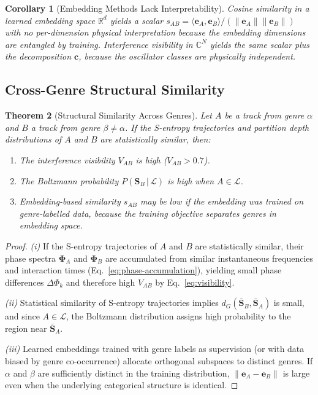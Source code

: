 \documentclass[11pt,twocolumn,a4paper]{article}
\newtheorem{theorem}{Theorem}[section]
\newtheorem{corollary}[theorem]{Corollary}
\newcommand{\R}{\mathbb{R}}
\newcommand{\CC}{\mathbb{C}}
\newcommand{\Lib}{\mathcal{L}}
\newcommand{\Spec}{\bm{\Phi}}
\begin{document}
\begin{corollary}[Embedding Methods Lack Interpretability]
\label{cor:embedding-opaque}
Cosine similarity in a learned embedding space $\R^d$ yields a scalar
$s_{AB} = \langle \mathbf{e}_A, \mathbf{e}_B \rangle / (\|\mathbf{e}_A\|
\|\mathbf{e}_B\|)$ with no per-dimension physical interpretation
because the embedding dimensions are entangled by training. Interference
visibility in $\CC^N$ yields the same scalar \emph{plus} the
decomposition $\mathbf{c}$, because the oscillator classes are
physically independent.
\end{corollary}

\subsection{Cross-Genre Structural Similarity}

\begin{theorem}[Structural Similarity Across Genres]
\label{thm:cross-genre}
Let $A$ be a track from genre $\alpha$ and $B$ a track from genre
$\beta \neq \alpha$. If the S-entropy trajectories and partition depth
distributions of $A$ and $B$ are statistically similar, then:
\begin{enumerate}[label=(\roman*),leftmargin=*]
\item The interference visibility $V_{AB}$ is high ($V_{AB} > 0.7$).
\item The Boltzmann probability $P(\mathbf{S}_B\,|\,\Lib)$ is high
  when $A \in \Lib$.
\item Embedding-based similarity $s_{AB}$ may be low if the
  embedding was trained on genre-labelled data, because the training
  objective separates genres in embedding space.
\end{enumerate}
\end{theorem}

\begin{proof}
\textit{(i)} If the S-entropy trajectories of $A$ and $B$ are
statistically similar, their phase spectra $\Spec_A$ and $\Spec_B$ are
accumulated from similar instantaneous frequencies and interaction
times (Eq.~\eqref{eq:phase-accumulation}), yielding small phase
differences $\Delta\Phi_k$ and therefore high $V_{AB}$ by
Eq.~\eqref{eq:visibility}.

\textit{(ii)} Statistical similarity of S-entropy trajectories implies
$d_G(\bar{\mathbf{S}}_B, \bar{\mathbf{S}}_A)$ is small, and since $A
\in \Lib$, the Boltzmann distribution assigns high probability to the
region near $\bar{\mathbf{S}}_A$.

\textit{(iii)} Learned embeddings trained with genre labels as
supervision (or with data biased by genre co-occurrence) allocate
orthogonal subspaces to distinct genres. If $\alpha$ and $\beta$ are
sufficiently distinct in the training distribution, $\|\mathbf{e}_A -
\mathbf{e}_B\|$ is large even when the underlying categorical
structure is identical.
\end{proof}
\end{document}
